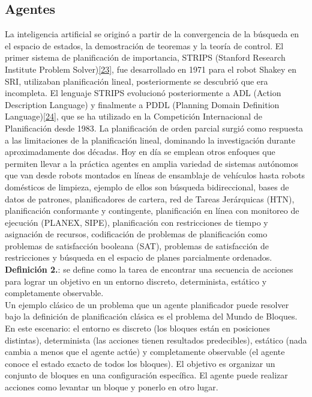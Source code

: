    \subsection*{ \Large Agentes}

    La inteligencia artificial se originó a partir de la convergencia de la búsqueda en el espacio de estados, la demostración de teoremas y la teoría de control.
        El primer sistema de planificación de importancia, STRIPS (Stanford Research Institute Problem Solver)\hyperref[sec:33]{[23]}, fue desarrollado en 1971 para el robot Shakey en SRI,
        utilizaban planificación lineal, posteriormente se descubrió que era incompleta. El lenguaje STRIPS evolucionó posteriormente a ADL (Action Description
        Language) y finalmente a PDDL (Planning Domain Definition Language)\hyperref[sec:34]{[24]}, que se ha utilizado en la Competición Internacional de Planificación desde 1983.
        La planificación de orden parcial surgió como respuesta a las limitaciones de la planificación lineal, dominando la investigación durante aproximadamente dos
        décadas. Hoy en día se emplean otros enfoques que permiten llevar a la práctica agentes en amplia variedad de sistemas autónomos que van desde robots montados
        en líneas de ensamblaje de vehículos hasta robots domésticos de limpieza, ejemplo de ellos son búsqueda bidireccional, bases de datos de patrones,
        planificadores de cartera, red de Tareas Jerárquicas (HTN), planificación conformante y contingente, planificación en línea con monitoreo de ejecución
        (PLANEX, SIPE), planificación con restricciones de tiempo y asignación de recursos, codificación de problemas de planificación
        como problemas de satisfacción booleana (SAT), problemas de satisfacción de restricciones y búsqueda en el espacio de planes parcialmente ordenados. \\


        \textbf{Definición 2.}: se define como la tarea de encontrar una secuencia de acciones para lograr un objetivo en un entorno discreto, determinista, estático y completamente observable. \\

        Un ejemplo clásico de un problema que un agente planificador puede resolver bajo la definición de planificación clásica es el problema del Mundo de Bloques. En este escenario: el entorno es discreto (los bloques están en posiciones distintas), determinista (las acciones tienen resultados predecibles), estático (nada cambia a menos que el agente actúe) y completamente observable (el agente conoce el estado exacto de todos los bloques). El objetivo es organizar un conjunto de bloques en una configuración específica. El agente puede realizar acciones como levantar un bloque y ponerlo en otro lugar.\\

